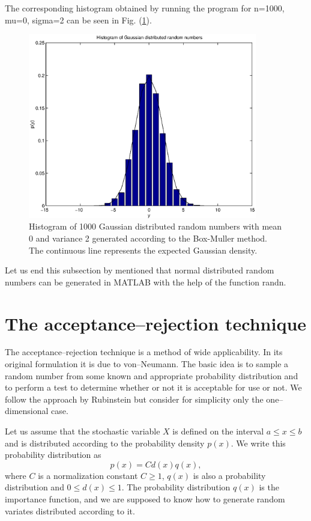 The corresponding histogram obtained by running the program for
n=1000, mu=0, sigma=2 can be seen in Fig. (\ref{F_GAUSSDISTR}).
\begin{figure}
\label{F_GAUSSDISTR}
\includegraphics[width=10cm]{./Figures/f_gaussdistr.eps}
\caption{Histogram of 1000 Gaussian distributed random numbers with
mean 0 and variance 2 generated according to the Box-Muller method. 
The continuous line represents the expected Gaussian density.}
\end{figure}

Let us end this subsection by mentioned that normal distributed
random numbers can be generated in MATLAB with the help of 
the function {\sf randn}.

\section{The acceptance--rejection technique}
The acceptance--rejection technique is a method of wide 
applicability. In its original formulation it is due to 
von--Neumann. The basic idea is to sample a random number
from some known and appropriate probability distribution and to 
perform a test to determine whether or not it is acceptable for 
use or not. We follow the approach by Rubinstein 
\cite{RUBINSTEIN} but consider for simplicity only
the one--dimensional case.

Let us assume that the stochastic variable $X$ is defined on the 
interval $a \le x \le b$ and is distributed according to the
probability density $p(x)$. We write this probability distribution 
as
\begin{equation*}
p(x) = C d(x) q(x),
\end{equation*}
where $C$ is a normalization constant $C \ge 1$, $q(x)$ is also a 
probability distribution and $0 \le d(x) \le 1$. The probability 
distribution $q(x)$ is the importance function, and  we are 
supposed to know how to generate random variates distributed 
according to it.

